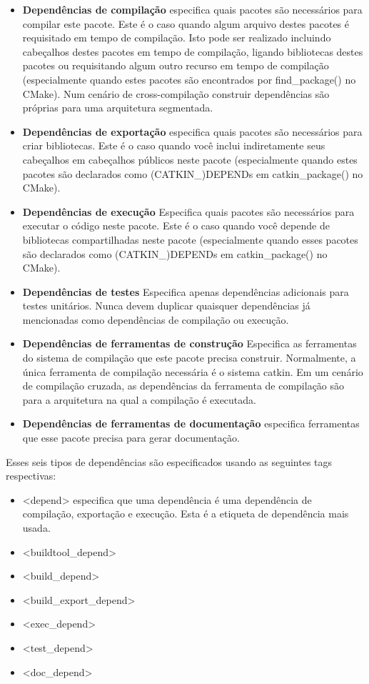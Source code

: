 \begin{itemize}
	\setlength{\itemsep}{1pt}
	\setlength{\parskip}{0pt}
	\setlength{\parsep}{0pt}
	\item \textbf{Dependências de compilação} especifica quais pacotes são necessários para compilar este pacote. Este é o caso quando algum arquivo destes pacotes é requisitado em tempo de compilação. Isto pode ser realizado incluindo cabeçalhos destes pacotes em tempo de compilação, ligando bibliotecas destes pacotes ou requisitando algum outro recurso em tempo de compilação (especialmente quando estes pacotes são encontrados por find\_package() no CMake). Num cenário de cross-compilação construir dependências são próprias para uma arquitetura segmentada.
	\item \textbf{Dependências de exportação} 
	especifica quais pacotes são necessários para criar bibliotecas. Este é o caso quando você inclui indiretamente seus cabeçalhos em cabeçalhos públicos neste pacote (especialmente quando estes pacotes são declarados como (CATKIN\_)DEPENDs em catkin\_package() no CMake).
	\item \textbf{Dependências de execução} 
	Especifica quais pacotes são necessários para executar o código neste pacote. Este é o caso quando você depende de bibliotecas compartilhadas neste pacote (especialmente quando esses pacotes são declarados como (CATKIN\_)DEPENDs em catkin\_package() no CMake).
	\item \textbf{Dependências de testes} 
	Especifica apenas dependências adicionais para testes unitários. Nunca devem duplicar quaisquer dependências já mencionadas como dependências de compilação ou execução.
	\item \textbf{Dependências de ferramentas de construção} Especifica as ferramentas do sistema de compilação que este pacote precisa construir. Normalmente, a única ferramenta de compilação necessária é o sistema catkin. Em um cenário de compilação cruzada, as dependências da ferramenta de compilação são para a arquitetura na qual a compilação é executada.
	\item \textbf{Dependências de ferramentas de documentação} especifica ferramentas que esse pacote precisa para gerar documentação.
\end{itemize}

Esses seis tipos de dependências são especificados usando as seguintes tags respectivas:

\begin{itemize}
	\setlength{\itemsep}{1pt}
	\setlength{\parskip}{0pt}
	\setlength{\parsep}{0pt}
	\item []<depend> especifica que uma dependência é uma dependência de compilação, exportação e execução. Esta é a etiqueta de dependência mais usada.
	\item []<buildtool\_depend>
	\item []<build\_depend>
	\item []<build\_export\_depend>
	\item []<exec\_depend>
	\item []<test\_depend>
	\item []<doc\_depend>
\end{itemize}

